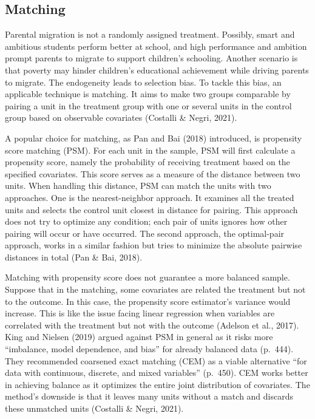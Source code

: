 \documentclass[
  man,floatsintext]{apa7}
\begin{document}
\newpage

\hypertarget{matching}{%
\subsection{Matching}\label{matching}}

Parental migration is not a randomly assigned treatment. Possibly, smart and ambitious students perform better at school, and high performance and ambition prompt parents to migrate to support children's schooling. Another scenario is that poverty may hinder children's educational achievement while driving parents to migrate. The endogeneity leads to selection bias. To tackle this bias, an applicable technique is matching. It aims to make two groups comparable by pairing a unit in the treatment group with one or several units in the control group based on observable covariates (Costalli \& Negri, 2021).

A popular choice for matching, as Pan and Bai (2018) introduced, is propensity score matching (PSM). For each unit in the sample, PSM will first calculate a propensity score, namely the probability of receiving treatment based on the specified covariates. This score serves as a measure of the distance between two units. When handling this distance, PSM can match the units with two approaches. One is the nearest-neighbor approach. It examines all the treated units and selects the control unit closest in distance for pairing. This approach does not try to optimize any condition; each pair of units ignores how other pairing will occur or have occurred. The second approach, the optimal-pair approach, works in a similar fashion but tries to minimize the absolute pairwise distances in total (Pan \& Bai, 2018).

Matching with propensity score does not guarantee a more balanced sample. Suppose that in the matching, some covariates are related the treatment but not to the outcome. In this case, the propensity score estimator's variance would increase. This is like the issue facing linear regression when variables are correlated with the treatment but not with the outcome (Adelson et al., 2017). King and Nielsen (2019) argued against PSM in general as it risks more ``imbalance, model dependence, and bias'' for already balanced data (p.~444). They recommended coarsened exact matching (CEM) as a viable alternative ``for data with continuous, discrete, and mixed variables'' (p.~450). CEM works better in achieving balance as it optimizes the entire joint distribution of covariates. The method's downside is that it leaves many units without a match and discards these unmatched units (Costalli \& Negri, 2021).
\end{document}
